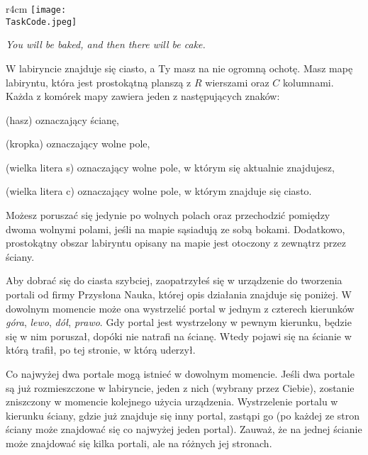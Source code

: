 \documentclass{boi2014-pl}
\renewcommand{\TaskCode}{portals}
\newcommand{\constant}[1]{{\tt #1}}
\begin{document}
    \begin{wrapfigure}[4]{r}{4cm}
        \vspace{-24pt}
		\texttt{[image: \\TaskCode.jpeg]}
	\end{wrapfigure}

    \emph{You will be baked, and then there will be cake.}

    W labiryncie znajduje się ciasto, a Ty masz na nie ogromną ochotę.
    Masz mapę labiryntu, która jest prostokątną planszą z $R$ wierszami oraz $C$ kolumnami.
    Każda z komórek mapy zawiera jeden z następujących znaków:
    \begin{description}[itemindent=1pt]
    	\item[\constant{\#}] (hasz) oznaczający ścianę,
        \item[\constant{.}] (kropka) oznaczający wolne pole,
        \item[\constant{S}] (wielka litera s) oznaczający wolne pole, w którym się aktualnie znajdujesz,
        \item[\constant{C}] (wielka litera c) oznaczający wolne pole, w którym znajduje się ciasto.
    \end{description}

    Możesz poruszać się jedynie po wolnych polach oraz przechodzić pomiędzy dwoma wolnymi polami,
    jeśli na mapie sąsiadują ze sobą bokami.
    Dodatkowo, prostokątny obszar labiryntu opisany na mapie jest otoczony z zewnątrz przez ściany.

    Aby dobrać się do ciasta szybciej, zaopatrzyłeś się w urządzenie do tworzenia portali od firmy
    Przysłona Nauka\texttrademark{}, której opis działania znajduje się poniżej.
    W dowolnym momencie może ona wystrzelić portal w jednym z czterech kierunków \emph{góra}, \emph{lewo}, \emph{dół}, \emph{prawo}.
    Gdy portal jest wystrzelony w pewnym kierunku, będzie się w nim poruszał, dopóki nie natrafi na ścianę.
    Wtedy pojawi się na ścianie w którą trafił, po tej stronie, w którą uderzył.
    
    Co najwyżej dwa portale mogą istnieć w dowolnym momencie.
    Jeśli dwa portale są już rozmieszczone w labiryncie, jeden z nich (wybrany przez Ciebie), zostanie zniszczony w momencie kolejnego użycia urządzenia.
    Wystrzelenie portalu w kierunku ściany, gdzie już znajduje się inny portal, zastąpi go (po każdej ze stron ściany może znajdować się co najwyżej jeden portal).
    Zauważ, że na jednej ścianie może znajdować się kilka portali, ale na różnych jej stronach.
\end{document}
